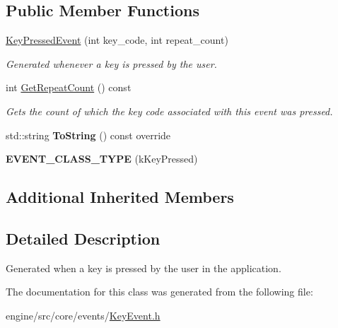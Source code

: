 \subsection*{Public Member Functions}
\begin{DoxyCompactItemize}
\item 
\mbox{\label{classengine_1_1events_1_1KeyPressedEvent_adc492a01f4883f3632a30042891bc97a}} 
\hyperlink{classengine_1_1events_1_1KeyPressedEvent_adc492a01f4883f3632a30042891bc97a}{Key\+Pressed\+Event} (int key\+\_\+code, int repeat\+\_\+count)
\begin{DoxyCompactList}\small\item\em Generated whenever a key is pressed by the user. \end{DoxyCompactList}\item 
\mbox{\label{classengine_1_1events_1_1KeyPressedEvent_a6287172d5b6c9600fcc129d69cda49cd}} 
int \hyperlink{classengine_1_1events_1_1KeyPressedEvent_a6287172d5b6c9600fcc129d69cda49cd}{Get\+Repeat\+Count} () const
\begin{DoxyCompactList}\small\item\em Gets the count of which the key code associated with this event was pressed. \end{DoxyCompactList}\item 
\mbox{\label{classengine_1_1events_1_1KeyPressedEvent_af7c728af6e5a62418cb1faee0710e9ad}} 
std\+::string {\bfseries To\+String} () const override
\item 
\mbox{\label{classengine_1_1events_1_1KeyPressedEvent_a67a1b66f53a5ec23d70c374a64530056}} 
{\bfseries E\+V\+E\+N\+T\+\_\+\+C\+L\+A\+S\+S\+\_\+\+T\+Y\+PE} (k\+Key\+Pressed)
\end{DoxyCompactItemize}
\subsection*{Additional Inherited Members}


\subsection{Detailed Description}
Generated when a key is pressed by the user in the application. 

The documentation for this class was generated from the following file\+:\begin{DoxyCompactItemize}
\item 
engine/src/core/events/\hyperlink{KeyEvent_8h}{Key\+Event.\+h}\end{DoxyCompactItemize}
